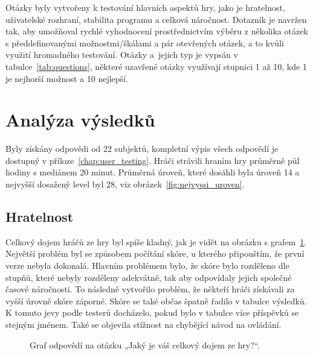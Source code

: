 Otázky byly vytvořeny k testování hlavních aspektů hry, jako je hratelnost, uživatelské rozhraní, stabilita programu a celková náročnost. Dotazník je navržen tak, aby umožňoval rychlé vyhodnocení prostřednictvím výběru z několika otázek s předdefinovanými možnostmi/škálami a pár otevřených otázek, a to kvůli využití hromadného testování. Otázky a~jejich typ je vypsán v tabulce~\ref{tab:questions}, některé uzavřené otázky využívají stupnici 1 až 10, kde 1 je nejhorší možnost a 10 nejlepší.

\section{Analýza výsledků} \label{chap:Analýza výsledků}
Byly získány odpovědi od 22 subjektů, kompletní výpis všech odpovědí je dostupný v příloze~\ref{chap:user_testing}. Hráči strávili hraním hry průměrně půl hodiny s mediánem 20 minut. Průměrná úroveň, které dosáhli byla úroveň 14 a nejvyšší dosažený level byl 28, viz obrázek~\ref{fig:nejvyssi_uroven}.

\subsection*{Hratelnost}
Celkový dojem hráčů ze hry byl spíše kladný, jak je vidět na obrázku s grafem~\ref{fig:hodnoceni_celkovy_dojem}. Největší problém byl se způsobem počítání skóre, u kterého připouštím, že první verze nebyla dokonalá. Hlavním problémem bylo, že skóre bylo rozděleno dle stupňů, které nebyly rozděleny adekvátně, tak aby odpovídaly jejich společné časové náročnosti. To následně vytvořilo problém, že někteří hráči získávali za vyšší úrovně skóre záporné. Skóre se také občas špatně řadilo v tabulce výsledků. K tomuto jevy podle testerů docházelo, pokud bylo v tabulce více příspěvků se stejným jménem. Také se objevila stížnost na chybějící návod na ovládání.

\begin{figure}[ht]
    \centering
    \caption{Graf odpovědí na otázku „Jaký je váš celkový dojem ze hry?“.}
    \label{fig:hodnoceni_celkovy_dojem}
\end{figure}

